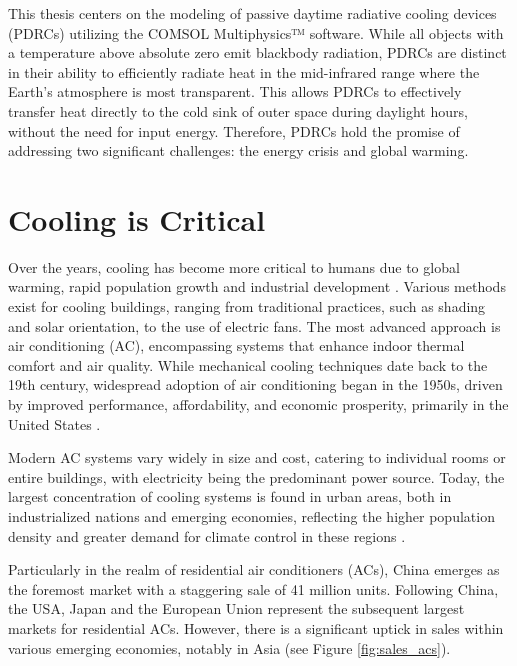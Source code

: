 This thesis centers on the modeling of passive daytime radiative cooling devices (PDRCs) utilizing the COMSOL Multiphysics™ software. While all objects with a temperature above absolute zero emit blackbody radiation, PDRCs are distinct in their ability to efficiently radiate heat in the mid-infrared range where the Earth's atmosphere is most transparent. This allows PDRCs to effectively transfer heat directly to the cold sink of outer space during daylight hours, without the need for input energy. Therefore, PDRCs hold the promise of addressing two significant challenges: the energy crisis and global warming.


\section{Cooling is Critical}
Over the years, cooling has become more critical to humans due to global warming, rapid population growth and industrial development \cite{chen_passive_2022}. Various methods exist for cooling buildings, ranging from traditional practices, such as shading and solar orientation, to the use of electric fans. The most advanced approach is air conditioning (AC), encompassing systems that enhance indoor thermal comfort and air quality. While mechanical cooling techniques date back to the 19th century, widespread adoption of air conditioning began in the 1950s, driven by improved performance, affordability, and economic prosperity, primarily in the United States \cite{international_energy_agency_future_2018}.

Modern AC systems vary widely in size and cost, catering to individual rooms or entire buildings, with electricity being the predominant power source. Today, the largest concentration of cooling systems is found in urban areas, both in industrialized nations and emerging economies, reflecting the higher population density and greater demand for climate control in these regions \cite{international_energy_agency_future_2018}. 

Particularly in the realm of residential air conditioners (ACs), China emerges as the foremost market with a staggering sale of 41 million units. Following China, the USA, Japan and the European Union represent the subsequent largest markets for residential ACs. However, there is a significant uptick in sales within various emerging economies, notably in Asia (see Figure \ref{fig:sales_acs}).

